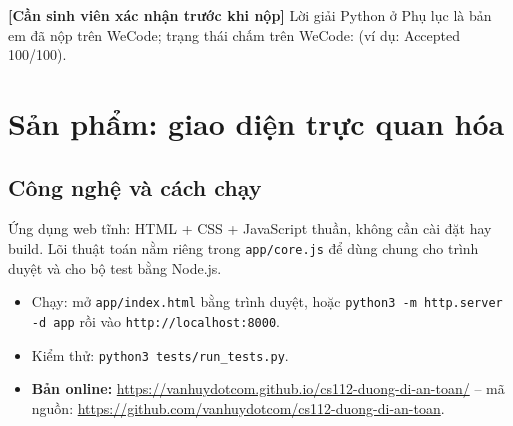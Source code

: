 \documentclass[12pt,a4paper]{article}
\begin{document}
\begin{xacnhan}
\textbf{[Cần sinh viên xác nhận trước khi nộp]} Lời giải Python ở Phụ lục là bản em đã nộp trên WeCode; trạng thái chấm trên WeCode: \underline{\hspace{4cm}} (ví dụ: Accepted 100/100).
\end{xacnhan}

\section{Sản phẩm: giao diện trực quan hóa}
\subsection{Công nghệ và cách chạy}
Ứng dụng web tĩnh: HTML + CSS + JavaScript thuần, không cần cài đặt hay build. Lõi thuật toán nằm riêng trong \texttt{app/core.js} để dùng chung cho trình duyệt và cho bộ test bằng Node.js.
\begin{itemize}
  \item Chạy: mở \texttt{app/index.html} bằng trình duyệt, hoặc \texttt{python3 -m http.server -d app} rồi vào \texttt{http://localhost:8000}.
  \item Kiểm thử: \texttt{python3 tests/run\_tests.py}.
  \item \textbf{Bản online:} \url{https://vanhuydotcom.github.io/cs112-duong-di-an-toan/} -- mã nguồn: \url{https://github.com/vanhuydotcom/cs112-duong-di-an-toan}.
\end{itemize}
\end{document}
